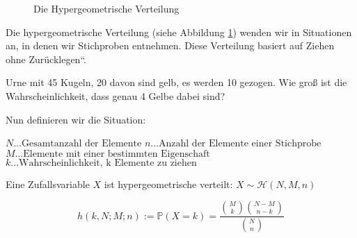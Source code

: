 {    {
        \begin{figure}
            \def\nval{20}
            \def\Nvala{30}
            \def\Mvala{20}
            \def\Nvalb{50}
            \def\Mvalb{20}
            \def\Nvalc{30}
            \def\Mvalc{10}
            \def\steps{20}

            \subfigure[Wahrscheinlichkeitsfunktion]{
                \begin{tikzpicture}
                                
                \end{tikzpicture}
                \label{fig:hyper_dist_a}
            }
           \caption{Die Hypergeometrische Verteilung}
           \label{fig:hyper_dist}
        \end{figure}
    }

    Die hypergeometrische Verteilung (siehe Abbildung \ref{fig:hyper_dist}) wenden wir in Situationen an, in denen
    wir Stichproben entnehmen. Diese Verteilung basiert auf
    {\quotedblbase}Ziehen ohne Zurücklegen{\textquotedblleft}. 
    \begin{bsp}
        Urne mit 45 Kugeln, 20 davon sind gelb, es werden 10 gezogen.
        Wie groß ist die Wahrscheinlichkeit, dass genau 4 Gelbe dabei sind?
    \end{bsp}
    Nun definieren wir die Situation:

    {\centering  $N\ldots \text{Gesamtanzahl~der~Elemente}$\newline
     $n\ldots \text{Anzahl~der~Elemente~einer~Stichprobe}$\newline
     $M\ldots \text{Elemente~mit~einer~bestimmten~Eigenschaft}$\newline
     $k\ldots \text{Wahrscheinlichkeit,~k~Elemente~zu~ziehen}$\par}

     \begin{definition}
         Eine Zufallsvariable $X$ ist hypergeometrische verteilt: $X\sim\mathcal H(N,M,n)$

         \[h\left(k,N;M;n\right):=\mathbb P\left(X=k\right)=
            \frac{\binom{M}{k}\binom{N-M}{n-k}}{\binom{N}{n}}\]
    \end{definition}

}

